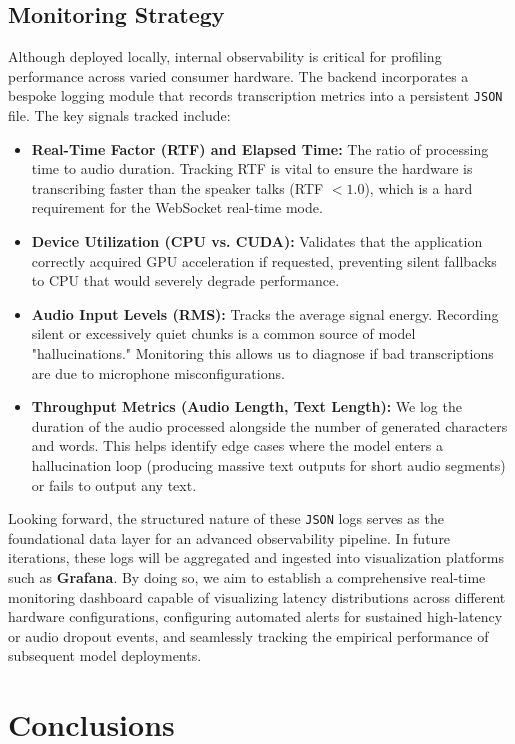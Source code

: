 \documentclass[12pt]{article}
\begin{document}
\subsection{Monitoring Strategy}
Although deployed locally, internal observability is critical for profiling performance across varied consumer hardware. The backend incorporates a bespoke logging module that records transcription metrics into a persistent \texttt{JSON} file. The key signals tracked include:
\begin{itemize}
    \item \textbf{Real-Time Factor (RTF) and Elapsed Time:} The ratio of processing time to audio duration. Tracking RTF is vital to ensure the hardware is transcribing faster than the speaker talks (RTF $< 1.0$), which is a hard requirement for the WebSocket real-time mode.
    \item \textbf{Device Utilization (CPU vs. CUDA):} Validates that the application correctly acquired GPU acceleration if requested, preventing silent fallbacks to CPU that would severely degrade performance.
    \item \textbf{Audio Input Levels (RMS):} Tracks the average signal energy. Recording silent or excessively quiet chunks is a common source of model "hallucinations." Monitoring this allows us to diagnose if bad transcriptions are due to microphone misconfigurations.
    \item \textbf{Throughput Metrics (Audio Length, Text Length):} We log the duration of the audio processed alongside the number of generated characters and words. This helps identify edge cases where the model enters a hallucination loop (producing massive text outputs for short audio segments) or fails to output any text.
\end{itemize}

Looking forward, the structured nature of these \texttt{JSON} logs serves as the foundational data layer for an advanced observability pipeline. In future iterations, these logs will be aggregated and ingested into visualization platforms such as \textbf{Grafana}. By doing so, we aim to establish a comprehensive real-time monitoring dashboard capable of visualizing latency distributions across different hardware configurations, configuring automated alerts for sustained high-latency or audio dropout events, and seamlessly tracking the empirical performance of subsequent model deployments.

\section{Conclusions}
\end{document}
